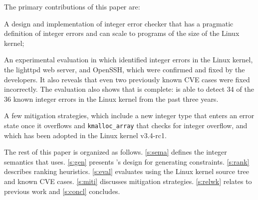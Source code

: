The primary contributions of this paper are:
\begin{CompactItemize}
\item A design and implementation of integer error checker that has a pragmatic
  definition of integer errors and can scale to programs of the size of the
  Linux kernel;
\item An experimental evaluation in which identified \nrbugs integer errors in
  the Linux kernel, the lighttpd web server, and OpenSSH, which were confirmed
  and fixed by the developers.  It also reveals that even two previously known
  CVE cases were fixed incorrectly.  The evaluation also shows that \sys is
  complete: \sys is able to detect 34 of the 36 known integer errors in the
  Linux kernel from the past three years.
\item A few mitigation strategies, which include a new integer type that enters
  an error state once it overflows and \texttt{kmalloc\_array} that checks for
  integer overflow, and which has been adopted in the Linux kernel v3.4-rc1.
\end{CompactItemize}

The rest of this paper is organized as follows. \autoref{s:sema}
defines the integer semantics that \sys uses.  \autoref{s:gen}
presents \sys's design for generating constraints.  \autoref{s:rank}
describes ranking heuristics.  \autoref{s:eval} evaluates \sys using
the Linux kernel source tree and known CVE cases.
\autoref{s:miti} discusses mitigation strategies.
\autoref{s:relwk} relates \sys to previous work and \autoref{s:concl}
concludes.
